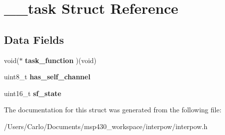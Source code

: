 \hypertarget{struct____task}{}\section{\+\_\+\+\_\+task Struct Reference}
\label{struct____task}
\subsection*{Data Fields}
\begin{DoxyCompactItemize}
\item 
\mbox{\label{struct____task_a4766f0ad0950af7fd9567d65c2e40be5}} 
void($\ast$ {\bfseries task\+\_\+function} )(void)
\item 
\mbox{\label{struct____task_a706e246b62e3fcb45dcbf06abb228791}} 
uint8\+\_\+t {\bfseries has\+\_\+self\+\_\+channel}
\item 
\mbox{\label{struct____task_a5787bd5f2ca3ba5b257f4c2f89f5ff50}} 
uint16\+\_\+t {\bfseries sf\+\_\+state}
\end{DoxyCompactItemize}


The documentation for this struct was generated from the following file\+:\begin{DoxyCompactItemize}
\item 
/\+Users/\+Carlo/\+Documents/msp430\+\_\+workspace/interpow/interpow.\+h\end{DoxyCompactItemize}
